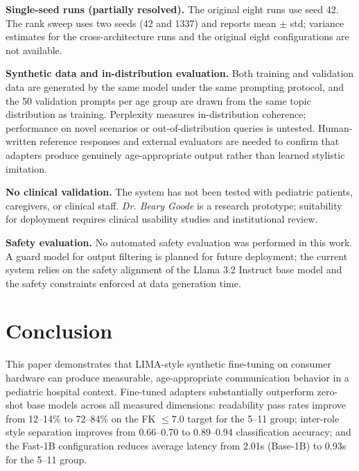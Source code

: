 \documentclass[journal]{IEEEtai}
\begin{document}
\textbf{Single-seed runs (partially resolved).} The original eight runs use seed 42. The rank sweep uses two seeds (42 and 1337) and reports mean $\pm$ std; variance estimates for the cross-architecture runs and the original eight configurations are not available.

\textbf{Synthetic data and in-distribution evaluation.} Both training and validation data are generated by the same model under the same prompting protocol, and the 50 validation prompts per age group are drawn from the same topic distribution as training. Perplexity measures in-distribution coherence; performance on novel scenarios or out-of-distribution queries is untested. Human-written reference responses and external evaluators are needed to confirm that adapters produce genuinely age-appropriate output rather than learned stylistic imitation.

\textbf{No clinical validation.} The system has not been tested with pediatric patients, caregivers, or clinical staff. \textit{Dr. Beary Goode} is a research prototype; suitability for deployment requires clinical usability studies and institutional review.

\textbf{Safety evaluation.} No automated safety evaluation was performed in this work. A guard model for output filtering is planned for future deployment; the current system relies on the safety alignment of the Llama 3.2 Instruct base model and the safety constraints enforced at data generation time.

\section{Conclusion}

This paper demonstrates that LIMA-style synthetic fine-tuning on consumer hardware can produce measurable, age-appropriate communication behavior in a pediatric hospital context. Fine-tuned adapters substantially outperform zero-shot base models across all measured dimensions: readability pass rates improve from 12--14\% to 72--84\% on the FK $\leq 7.0$ target for the 5--11 group; inter-role style separation improves from 0.66--0.70 to 0.89--0.94 classification accuracy; and the Fast-1B configuration reduces average latency from 2.01s (Base-1B) to 0.93s for the 5--11 group.
\end{document}
